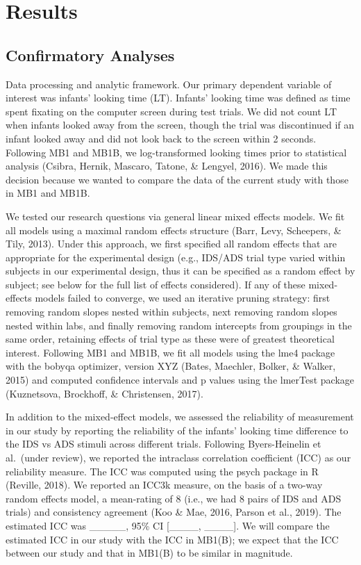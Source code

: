 \documentclass[
  ,man,floatsintext]{apa6}
\begin{document}
\hypertarget{results}{%
\section{Results}\label{results}}

\hypertarget{confirmatory-analyses}{%
\subsection{Confirmatory Analyses}\label{confirmatory-analyses}}

Data processing and analytic framework. Our primary dependent variable of interest was infants' looking time (LT). Infants' looking time was defined as time spent fixating on the computer screen during test trials. We did not count LT when infants looked away from the screen, though the trial was discontinued if an infant looked away and did not look back to the screen within 2 seconds. Following MB1 and MB1B, we log-transformed looking times prior to statistical analysis (Csibra, Hernik, Mascaro, Tatone, \& Lengyel, 2016). We made this decision because we wanted to compare the data of the current study with those in MB1 and MB1B.

We tested our research questions via general linear mixed effects models. We fit all models using a maximal random effects structure (Barr, Levy, Scheepers, \& Tily, 2013). Under this approach, we first specified all random effects that are appropriate for the experimental design (e.g., IDS/ADS trial type varied within subjects in our experimental design, thus it can be specified as a random effect by subject; see below for the full list of effects considered). If any of these mixed-effects models failed to converge, we used an iterative pruning strategy: first removing random slopes nested within subjects, next removing random slopes nested within labs, and finally removing random intercepts from groupings in the same order, retaining effects of trial type as these were of greatest theoretical interest. Following MB1 and MB1B, we fit all models using the lme4 package with the bobyqa optimizer, version XYZ (Bates, Maechler, Bolker, \& Walker, 2015) and computed confidence intervals and p values using the lmerTest package (Kuznetsova, Brockhoff, \& Christensen, 2017).

In addition to the mixed-effect models, we assessed the reliability of measurement in our study by reporting the reliability of the infants' looking time difference to the IDS vs ADS stimuli across different trials. Following Byers-Heinelin et al.~(under review), we reported the intraclass correlation coefficient (ICC) as our reliability measure. The ICC was computed using the psych package in R (Reville, 2018). We reported an ICC3k measure, on the basis of a two-way random effects model, a mean-rating of 8 (i.e., we had 8 pairs of IDS and ADS trials) and consistency agreement (Koo \& Mae, 2016, Parson et al., 2019). The estimated ICC was \_\_\_\_\_, 95\% CI {[}\_\_\_\_, \_\_\_\_{]}. We will compare the estimated ICC in our study with the ICC in MB1(B); we expect that the ICC between our study and that in MB1(B) to be similar in magnitude.
\end{document}
